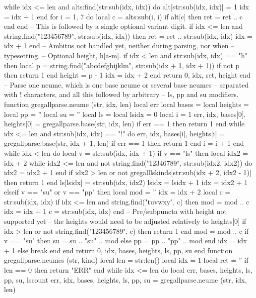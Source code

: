 \begin{luacode*}
  while idx <= len and alts:find(str:sub(idx, idx)) do
    alt[str:sub(idx, idx)] = 1
    idx = idx + 1
  end
  for i = 1, 7 do
    local c = alts:sub(i, i)
    if alt[c] then ret = ret .. c end
  end
  -- This is followed by a single optional variant digit.
  if idx <= len and string.find("123456789", str:sub(idx, idx)) then
    ret = ret .. str:sub(idx, idx)
    idx = idx + 1
  end
  -- Ambitus not handled yet, neither during parsing, nor when
  -- typesetting.
  -- Optional height, h[a-m].
  if idx < len and str:sub(idx, idx) == "h" then
    local p = string.find("abcdefghijklm", str:sub(idx + 1, idx + 1))
    if not p then return 1 end
    height = p - 1
    idx = idx + 2
  end
  return 0, idx, ret, height
end
-- Parse one neume, which is one base neume or several base neumes
-- separated with ! characters, and all this followed by arbitrary
-- ls, pp and su modifiers.
function gregallparse.neume (str, idx, len)
  local err
  local bases = {}
  local heights = {}
  local pp = ''
  local su = ''
  local ls = {}
  local lsidx = 0
  local i = 1
  err, idx, bases[0], heights[0] = gregallparse.base(str, idx, len)
  if err == 1 then return 1 end
  while idx <= len and str:sub(idx, idx) == "!" do
    err, idx, bases[i], heights[i] = gregallparse.base(str, idx + 1, len)
    if err == 1 then return 1 end
    i = i + 1
  end
  while idx < len do
    local v = str:sub(idx, idx + 1)
    if v == "ls" then
      local idx2 = idx + 2
      while idx2 <= len and not string.find("12346789", str:sub(idx2, idx2)) do
	idx2 = idx2 + 1
      end
      if idx2 > len or not gregalllskinds[str:sub(idx + 2, idx2 - 1)] then return 1 end
      ls[lsidx] = str:sub(idx, idx2)
      lsidx = lsidx + 1
      idx = idx2 + 1
    elseif v == "su" or v == "pp" then
      local mod = ''
      idx = idx + 2
      local c = str:sub(idx, idx)
      if idx <= len and string.find("tuvwxy", c) then
	mod = mod .. c
	idx = idx + 1
	c = str:sub(idx, idx)
      end
      -- Pre/subpuncta with height not supported yet
      -- the heights would need to be adjusted relatively to heights[0]
      if idx > len or not string.find("123456789", c) then return 1 end
      mod = mod .. c
      if v == "su" then su = su .. "su" .. mod else pp = pp .. "pp" .. mod end
      idx = idx + 1
    else break end
  end
  return 0, idx, bases, heights, ls, pp, su
end
function gregallparse.neumes (str, kind)
  local len = str:len()
  local idx = 1
  local ret = ''
  if len == 0 then return "ERR" end
  while idx <= len do
    local err, bases, heights, ls, pp, su, lscount
    err, idx, bases, heights, ls, pp, su = gregallparse.neume (str, idx, len)

\end{luacode*}
